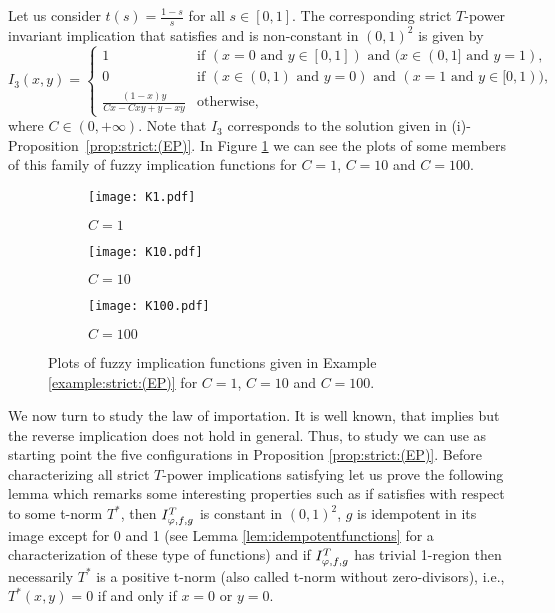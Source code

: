 \begin{example}\label{example:strict:(EP)} Let us consider $t(s)=\frac{1-s}{s}$ for all $s \in [0,1]$. The corresponding strict $T$-power invariant implication that satisfies \EP and is non-constant in $(0,1)^2$ is given by
	$$I_{3}(x,y) =\left\{ \begin{array}{ll}
		1 & \text{if } (x=0 \text{ and } y \in [0,1]) \text{ and } (x \in (0,1] \text{ and } y=1),\\
		0 &   \text{if }   (x \in (0,1) \text{ and } y=0) \text{ and } ( x = 1 \text{ and } y\in [0,1)), \\
		\frac{(1-x)y}{Cx-Cxy+y-xy} &  \text{otherwise},
	\end{array}
	\right.
	$$
	where $C\in (0,+\infty)$. Note that $I_3$ corresponds to the solution given in {(i)-Proposition~\ref{prop:strict:(EP)}}. In Figure \ref{exfig:strict:(EP)} we can see the plots of some members of this family of fuzzy implication functions for $C=1$, $C=10$ and $C=100$.
\end{example}
\begin{figure}[t]
	\centering
	\begin{subfigure}{.3\textwidth}
		\centering
		\texttt{[image: K1.pdf]}
		\caption{$C=1$}
	\end{subfigure}%
	\begin{subfigure}{.3\textwidth}
		\centering
		\texttt{[image: K10.pdf]}
		\caption{$C=10$}
	\end{subfigure}
	\begin{subfigure}{.3\textwidth}
		\centering
		\texttt{[image: K100.pdf]}
		\caption{$C=100$}
	\end{subfigure}
	\caption[Plots of three strict $T$-power invariant implications that satisfy \EP.]{Plots of fuzzy implication functions given in Example \ref{example:strict:(EP)} for $C=1$, $C=10$ and $C=100$.}
	\label{exfig:strict:(EP)}
\end{figure}
We now turn to study the law of importation. It is well known, that \LI implies \EP but the reverse implication does not hold in general. Thus, to study \LI we can use as starting point the five configurations in Proposition \ref{prop:strict:(EP)}. Before characterizing all strict $T$-power implications satisfying \LI let us prove the following lemma which remarks some interesting properties such as if \IT satisfies \LI with respect to some t-norm $T^*$, then $I^T_{\varphi,f,g}$ is constant in $(0,1)^2$, $g$ is idempotent in its image except for 0 and 1 (see Lemma \ref{lem:idempotentfunctions} for a characterization of these type of functions) and if $I^T_{\varphi,f,g}$ has trivial 1-region then necessarily $T^*$ is a positive t-norm (also called t-norm without zero-divisors), i.e., $T^*(x,y)=0$ if and only if $x=0$ or $y=0$.
